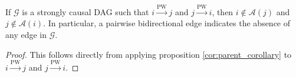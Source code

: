 \documentclass[12pt]{article}
\def\pwgc{\overset{\text{PW}}{\rightarrow}}  %
\def\gcg{\mathcal{G}}  %
\newcommand{\pa}[1]{pa(#1)}  %
\newcommand{\anc}[1]{\mathcal{A}(#1)}  %
\newcommand{\gcgpath}[2]{#1 \rightarrow \cdots \rightarrow #2}  %
\begin{document}


  
\begin{corollary}
  \label{cor:bidirectional_edge}
  If $\gcg$ is a strongly causal DAG such that $i \pwgc j$ and
  $j \pwgc i$, then $i \not\in \anc{j}$ and $j \not\in \anc{i}$.  In
  particular, a pairwise bidirectional edge indicates the absence of
  any edge in $\gcg$.
\end{corollary}
\begin{proof}
  This follows directly from applying proposition
  \ref{cor:parent_corollary} to $i \pwgc j$ and $j \pwgc i$.
\end{proof}

\end{document}
